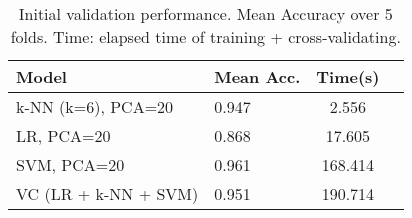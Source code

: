 \begin{table}
\centering
\caption{Initial validation performance. Mean Accuracy over 5 folds. Time: elapsed time of training + cross-validating.}
\label{tab:cross_validation}
\begin{tabular}{|l|l|c|c|}
\toprule
               Model &  Mean Acc. &    Time(s) \\
\midrule
  k-NN (k=6), PCA=20 &          0.947 &   2.556 \\
          LR, PCA=20 &          0.868 &  17.605 \\
         SVM, PCA=20 &          0.961 & 168.414 \\
VC (LR + k-NN + SVM) &          0.951 & 190.714 \\
\bottomrule
\end{tabular}
\end{table}
